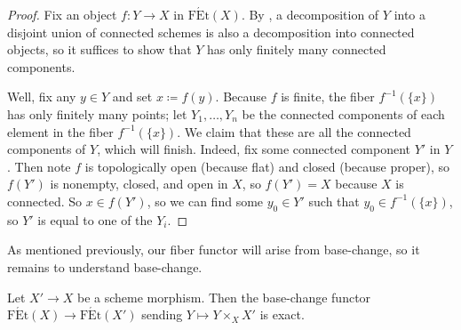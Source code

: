 \documentclass{amsart}
\begin{document}
\begin{proof}
    Fix an object $f\colon Y\to X$ in $\mathrm{F\acute Et}(X)$. By , a decomposition of $Y$ into a disjoint union of connected schemes is also a decomposition into connected objects, so it suffices to show that $Y$ has only finitely many connected components.
    
    Well, fix any $y\in Y$ and set $x\coloneqq f(y)$. Because $f$ is finite, the fiber $f^{-1}(\{x\})$ has only finitely many points; let $Y_1,\ldots,Y_n$ be the connected components of each element in the fiber $f^{-1}(\{x\})$. We claim that these are all the connected components of $Y$, which will finish. Indeed, fix some connected component $Y'$ in $Y$. Then note $f$ is topologically open (because flat) and closed (because proper), so $f(Y')$ is nonempty, closed, and open in $X$, so $f(Y')=X$ because $X$ is connected. So $x\in f(Y')$, so we can find some $y_0\in Y'$ such that $y_0\in f^{-1}(\{x\})$, so $Y'$ is equal to one of the $Y_i$.
\end{proof}
As mentioned previously, our fiber functor will arise from base-change, so it remains to understand base-change.
\begin{lemma} \label{lem:exact-base-change}
    Let $X'\to X$ be a scheme morphism. Then the base-change functor $\mathrm{F\acute Et}(X)\to\mathrm{F\acute Et}(X')$ sending $Y\mapsto Y\times_XX'$ is exact.
\end{lemma}
\end{document}
